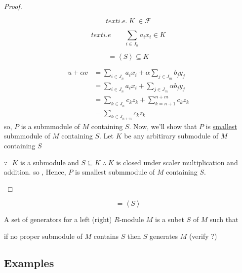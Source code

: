 \begin{proof}
\begin{description}
\[
text{i.e.} \ K \ \in \mathcal{F}
\]

\[
text{i.e}\qquad \sum\limits_{i \in J_n} a_i x_i  \in K 
\]

\[
 =\left\langle S\right\rangle \subseteq K 
\]

\begin{align*}
            u+ \alpha v &= \sum\limits_{i\in J_n}a_i x_i + \alpha \sum\limits_{j\in J_m}b_j y_j  \\
             & =\sum\limits_{i\in J_n}a_i x_i + \sum\limits_{j\in J_m}\alpha b_j y_j  \\
             &= \sum\limits_{k\in J_n}c_k z_k + \sum\limits_{k = n+1}^{n+m} c_k z_k  \\
             &=  \sum\limits_{k \in J_{n+m}} c_k z_k
          
\end{align*}
          so, $P$ is a submmodule of $M$ containing $S$.
          \newline Now, we'll show that $P$ is \underline{smallest} submmodule of $M$ containing $S$.
          \newline \bigskip
          Let $K$ be any arbitirary submodule of $M$ containing $S$
           
          $\because  \ \ \ K $ is a submodule and $S \subseteq K$ \newline
          $\therefore \  K$  is closed under scaler multiplication and addition.
          so , 
               Hence,  $P$ is smallest submmodule of $M$ containing $S$.
           \end{description}
	
	
	

\end{proof}
\bigskip

\[
 = \left\langle S\right\rangle 
\]

\begin{defn}
A set of generators for a left (right) $R$-module $M$ is a subet $S$ of $M$ such that

if no proper submodule of $M$ contains $S$ then $S$ generates $M$ (verify ?)

\end{defn}
\bigskip

\subsection{Examples}

